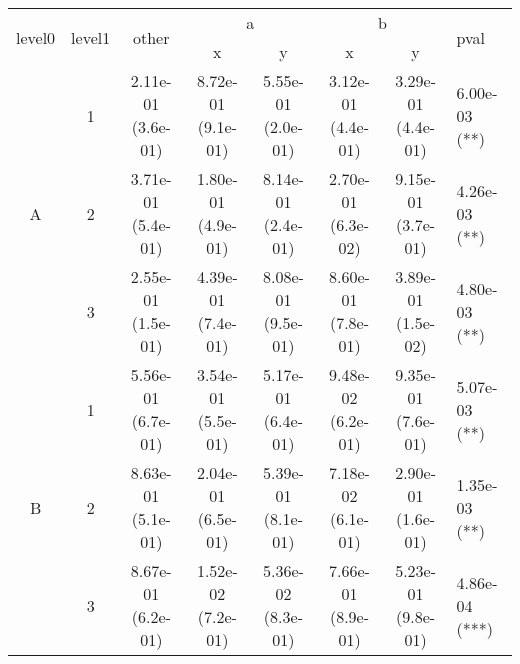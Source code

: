 \begin{tabular}{cccccccl}
\toprule
\multirow{2}{*}{level0} & \multirow{2}{*}{level1}& \multirow{2}{*}{other}&\multicolumn{2}{c}{a}&\multicolumn{2}{c}{b}& \multirow{2}{*}{pval}\tabularnewline
\cmidrule(lr){4-5}
\cmidrule(lr){6-7}
&&&x&y&x&y\tabularnewline
\midrule
\multirow{3}{*}{A}&1& 2.11e-01 (3.6e-01)& 8.72e-01 (9.1e-01)& 5.55e-01 (2.0e-01)& 3.12e-01 (4.4e-01)& 3.29e-01 (4.4e-01)& 6.00e-03 (**)\tabularnewline
&2& 3.71e-01 (5.4e-01)& 1.80e-01 (4.9e-01)& 8.14e-01 (2.4e-01)& 2.70e-01 (6.3e-02)& 9.15e-01 (3.7e-01)& 4.26e-03 (**)\tabularnewline
&3& 2.55e-01 (1.5e-01)& 4.39e-01 (7.4e-01)& 8.08e-01 (9.5e-01)& 8.60e-01 (7.8e-01)& 3.89e-01 (1.5e-02)& 4.80e-03 (**)\tabularnewline
\midrule
\multirow{3}{*}{B}&1& 5.56e-01 (6.7e-01)& 3.54e-01 (5.5e-01)& 5.17e-01 (6.4e-01)& 9.48e-02 (6.2e-01)& 9.35e-01 (7.6e-01)& 5.07e-03 (**)\tabularnewline
&2& 8.63e-01 (5.1e-01)& 2.04e-01 (6.5e-01)& 5.39e-01 (8.1e-01)& 7.18e-02 (6.1e-01)& 2.90e-01 (1.6e-01)& 1.35e-03 (**)\tabularnewline
&3& 8.67e-01 (6.2e-01)& 1.52e-02 (7.2e-01)& 5.36e-02 (8.3e-01)& 7.66e-01 (8.9e-01)& 5.23e-01 (9.8e-01)& 4.86e-04 (***)\tabularnewline
\bottomrule
\end{tabular}
